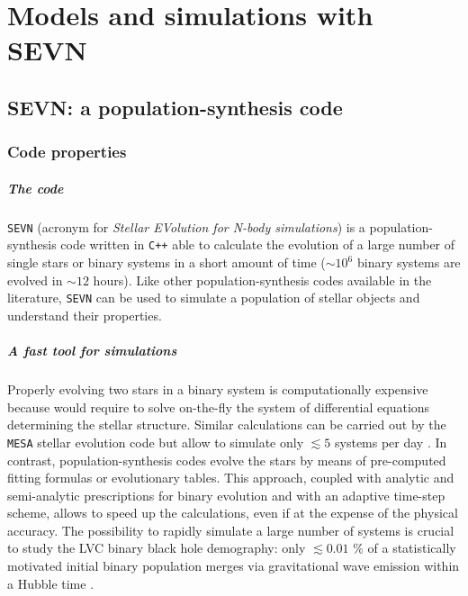 \documentclass[a4paper,titlepage]{book}     	%
\begin{document}







\chapter{Models and simulations with SEVN}%

\section{SEVN: a population-synthesis code}\label{sec:SEVN}
\subsection{Code properties}\label{subsec:SEVNproperties}
\paragraph{The code} \texttt{SEVN} (acronym for \emph{Stellar EVolution for N-body simulations}) is a population-synthesis code written in \texttt{C++} able to calculate the evolution of a large number of single stars or binary systems in a short amount of time ($\sim 10^{6}$ binary systems are evolved in $\sim 12$ hours)\cite{spera2019_mergingBBH}. Like other population-synthesis codes available in the literature, \texttt{SEVN} can be used to simulate a population of stellar objects and understand their properties.

\paragraph{A fast tool for simulations} Properly evolving two stars in a binary system is computationally expensive because would require to solve on-the-fly the system of differential equations determining the stellar structure. Similar calculations can be carried out by the \texttt{MESA} stellar evolution code but allow to simulate only $\lesssim 5$ systems per day \cite{MESA2015BinaryMT}. In contrast, population-synthesis codes evolve the stars by means of pre-computed fitting formulas or evolutionary tables. This approach, coupled with analytic and semi-analytic prescriptions for binary evolution and with an adaptive time-step scheme, allows to speed up the calculations, even if at the expense of the physical accuracy. The possibility to rapidly simulate a large number of systems is crucial to study the LVC binary black hole demography: only $\lesssim 0.01$ \% of a statistically motivated initial binary population merges via gravitational wave emission within a Hubble time \cite{spera2019_mergingBBH}.
\end{document}
